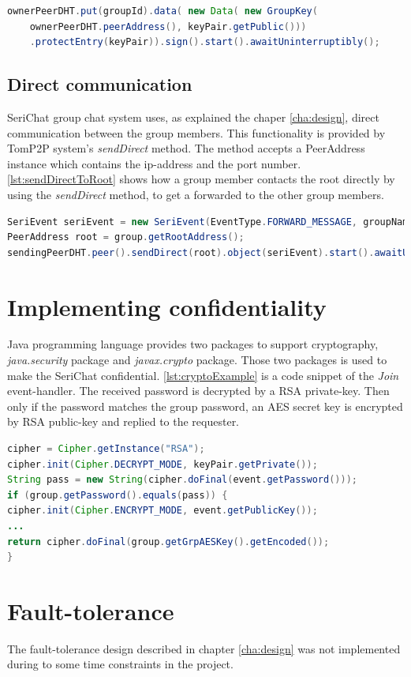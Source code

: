 \begin{lstlisting}[language=java,frame=tblr,caption={Entry signing by the group owner},label=lst:signingEntry]
ownerPeerDHT.put(groupId).data( new Data( new GroupKey(
	ownerPeerDHT.peerAddress(), keyPair.getPublic()))
	.protectEntry(keyPair)).sign().start().awaitUninterruptibly();
\end{lstlisting}

\subsection{Direct communication}
SeriChat group chat system uses, as explained the chaper \ref{cha:design}, direct communication between the group members. This functionality is provided by TomP2P system's \textit{sendDirect} method. The method accepts a PeerAddress instance which contains the ip-address and the port number. \autoref{lst:sendDirectToRoot} shows how a group member contacts the root directly by using the \textit{sendDirect} method, to get a forwarded to the other group members.
\begin{lstlisting}[language=java,frame=tblr,caption={Sending direct to the root},label=lst:sendDirectToRoot]
SeriEvent seriEvent = new SeriEvent(EventType.FORWARD_MESSAGE, groupName, msgBytes, nickName);
PeerAddress root = group.getRootAddress();
sendingPeerDHT.peer().sendDirect(root).object(seriEvent).start().awaitUninterruptibly();
\end{lstlisting}

\section{Implementing confidentiality}
Java programming language provides two packages to support cryptography, \textit{java.security} package and \textit{javax.crypto} package. Those two packages is used to make the SeriChat confidential. \autoref{lst:cryptoExample} is a code snippet of the \textit{Join} event-handler. The received password is decrypted by a RSA private-key. Then only if the password matches the group password, an AES secret key is encrypted by RSA public-key and replied to the requester.
\begin{lstlisting}[language=java,frame=tblr,caption={Example of \textit{java.security} and \textit{javax.crypto} usage},label=lst:cryptoExample]
cipher = Cipher.getInstance("RSA");
cipher.init(Cipher.DECRYPT_MODE, keyPair.getPrivate());
String pass = new String(cipher.doFinal(event.getPassword()));
if (group.getPassword().equals(pass)) {
cipher.init(Cipher.ENCRYPT_MODE, event.getPublicKey());
...
return cipher.doFinal(group.getGrpAESKey().getEncoded());
}
\end{lstlisting}

\section{Fault-tolerance}
The fault-tolerance design described in chapter \ref{cha:design} was not implemented during to some time constraints in the project.

